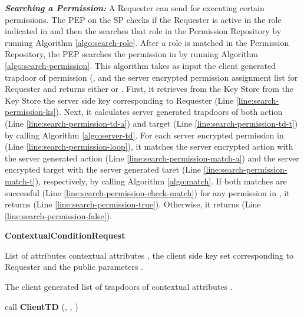 \documentclass[final,5p,times,twocolumn]{elsarticle}
\newcommand{\algofontsize}{\fontsize{7}{8}\selectfont}
\begin{document}
\emph{\textbf{Searching a Permission:}} A Requester can send  for executing certain permissions. The PEP on the SP checks if the Requester is active in the role indicated in  and then the searches that role in the Permission Repository by running Algorithm \ref{algo:search-role}. After a role is matched in the Permission Repository, the PEP searches the permission in  by running Algorithm \ref{algo:search-permission}. This algorithm takes as input the client generated trapdoor of permission (,  and the server encrypted permission assignment list  for Requester  and returns either  or . First, it retrieves from the Key Store from the Key Store the server side key  corresponding to Requester  (Line \ref{line:search-permission-ks}). Next, it calculates server generated trapdoors of both action (Line \ref{line:search-permission-td-a}) and target (Line \ref{line:search-permission-td-t}) by calling Algorithm \ref{algo:server-td}. For each server encrypted permission  in  (Line \ref{line:search-permission-loop}), it matches the server encrypted action with the server generated action (Line \ref{line:search-permission-match-a}) and the server encrypted target with the server generated taret (Line \ref{line:search-permission-match-t}), respectively, by calling Algorithm \ref{algo:match}. If both matches are successful (Line \ref{line:search-permission-check-match}) for any permission  in , it returns  (Line \ref{line:search-permission-true}). Otherwise, it returns  (Line \ref{line:search-permission-false}).




\begin{algorithm}[htp]
{\algofontsize
\caption{\textbf{ContextualConditionRequest}}

\label{algo:request-contextual-condition}

\begin{algorithmic}[1]

\REQUIRE List of attributes contextual attributes , the client side key set  corresponding to Requester  and the public parameters .

\ENSURE The client generated list of trapdoors of contextual attributes .

\medskip

\STATE  \label{request-cc-init}

 \label{request-cc-loop}

	\STATE  call \textbf{ClientTD} (, , ) \label{request-cc-td}
	
	\STATE  \label{request-cc-update}

\ENDFOR

\RETURN 

\end{algorithmic}
}
\end{algorithm}
\end{document}
